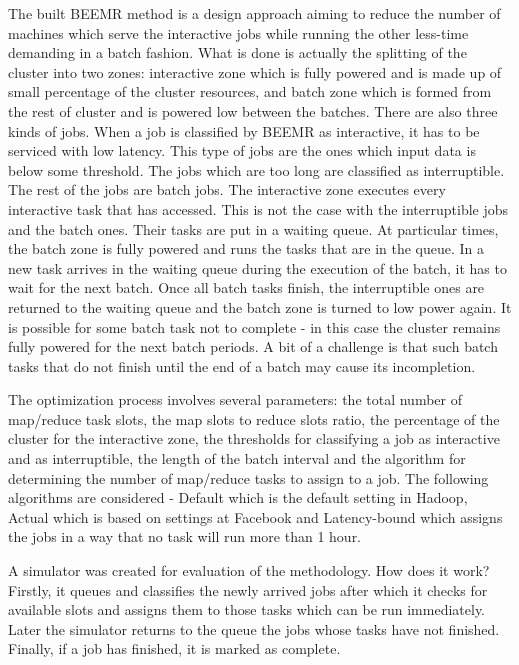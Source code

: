 \documentclass[9pt, a4paper]{article}
\theoremstyle{plain}
\begin{document}
The built BEEMR method is a design approach aiming to reduce the number of
machines which serve the interactive jobs while running the other less-time demanding
in a batch fashion. What is done is actually the splitting of the cluster into
two zones: interactive zone which is fully powered and is made up of small percentage
of the cluster resources, and batch zone which is formed from the rest of cluster
and is powered low between the batches. There are also three kinds of jobs. When
a job is classified by BEEMR as interactive, it has to be serviced with low latency.
This type of jobs are the ones which input data is below some threshold. The jobs
which are too long are classified as interruptible. The rest of the jobs are batch jobs.
The interactive zone executes every interactive task that has accessed. This is
not the case with the interruptible jobs and the batch ones. Their tasks are put in a waiting queue.
At particular times, the batch zone is fully powered and runs the tasks that are in
the queue. In a new task arrives in the waiting queue during the execution of the
batch, it has to wait for the next batch. Once all batch tasks finish, the interruptible
ones are returned to the waiting queue and the batch zone is turned to low power again.
It is possible for some batch task not to complete - in this case the cluster remains fully
powered for the next batch periods. A bit of a challenge is that such batch tasks that
do not finish until the end of a batch may cause its incompletion.

The optimization process involves several parameters: the total number of map/reduce
task slots, the map slots to reduce slots ratio, the percentage of the cluster for the
interactive zone, the thresholds for classifying a job as interactive and as interruptible,
the length of the batch interval and the algorithm for determining the number of
map/reduce tasks to assign to a job. The following algorithms are considered - Default which
is the default setting in Hadoop, Actual which is based on settings at Facebook
and Latency-bound which assigns the jobs in a way that no task will run more than 1 hour.

A simulator was created for evaluation of the methodology. How does it work? Firstly,
it queues and classifies the newly arrived jobs after which it checks for available slots
and assigns them to those tasks which can be run immediately. Later the simulator
returns to the queue the jobs whose tasks have not finished. Finally, if a job has finished,
it is marked as complete.
\end{document}
